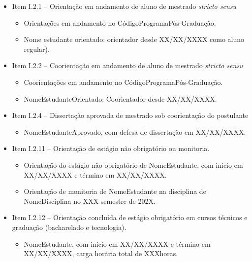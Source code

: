 \begin{itemize}
    \item Item I.2.1 -- Orientação em andamento de aluno de mestrado \textit{stricto sensu}
    \begin{itemize}
        \item Orientações em andamento no CódigoProgramaPós-Graduação.
           
        \item Nome estudante orientado: orientador desde XX/XX/XXXX como aluno regular).
    \end{itemize}
        
    \item Item I.2.2 -- Coorientação em andamento de aluno de mestrado \textit{stricto sensu}
    \begin{itemize}
        \item Coorientações em andamento no CódigoProgramaPós-Graduação.
    
        \item NomeEstudanteOrientado: Coorientador desde XX/XX/XXXX.
    \end{itemize}

    \item Item I.2.4 -- Dissertação aprovada de mestrado sob coorientação do postulante
    \begin{itemize}
        \item NomeEstudanteAprovado, com defesa de dissertação em XX/XX/XXXX.
    \end{itemize}

    \item Item I.2.11 -- Orientação de estágio não obrigatório ou monitoria.
    \begin{itemize}
        \item Orientação do estágio não obrigatório de NomeEstudante, com inicio em XX/XX/XXXX e término em XX/XX/XXXX.
        
        \item Orientação de monitoria de NomeEstudante na disciplina de NomeDisciplina no XXX semestre de 202X.
    \end{itemize}

    \item Item I.2.12 -- Orientação concluída de estágio obrigatório em cursos técnicos e graduação (bacharelado e tecnologia).
    \begin{itemize}
        \item NomeEstudante, com início em XX/XX/XXXX e término em XX/XX/XXXX, carga horária total de XXXhoras.
    \end{itemize}
    

\end{itemize}
